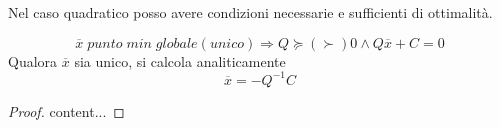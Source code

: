 Nel caso quadratico posso avere condizioni necessarie e sufficienti di ottimalità.

\begin{theorem}
	\label{thm:optimality-quadratic-ns}
	\begin{equation}
	\overline{x}\;punto\;min\;globale (unico)
	\Rightarrow
	Q \succeq (\succ) 0 \wedge Q\overline{x}+C=0
	\end{equation}
	Qualora $\overline{x}$ sia unico, si calcola analiticamente
	\begin{equation}
	\label{eqn:optimum-quadratic}
	\overline{x}=-Q^{-1}C
	\end{equation}
	\begin{proof}
		content...
	\end{proof}
\end{theorem}

